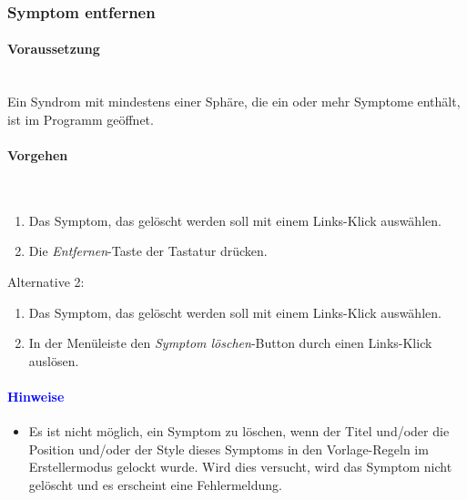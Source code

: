\documentclass[enabledeprecatedfontcommands,fontsize=11pt,paper=a4,twoside]{scrartcl}
\newcommand*{\hint}{\paragraph{\textcolor{blue}{Hinweise}}}
\newcommand*{\condition}{\paragraph{Voraussetzung}$\;$ \vspace{0.2cm}\\}
\newcommand*{\actions}{\paragraph{Vorgehen} $\;$\vspace{0.2cm}\\}
\begin{document}
		\newpage	
		\subsubsection{Symptom entfernen}
				\condition 	
		Ein Syndrom mit mindestens einer Sphäre, die ein oder mehr Symptome enthält, ist im Programm geöffnet. 
		\actions
		\begin{enumerate}
			\item Das Symptom, das gelöscht werden soll mit einem Links-Klick auswählen. 
			\item Die \textit{Entfernen}-Taste der Tastatur drücken.
		\end{enumerate}
		Alternative 2:
		\begin{enumerate}
			\item Das Symptom, das gelöscht werden soll mit einem Links-Klick auswählen. 
			\item In der Menüleiste den \textit{Symptom löschen}-Button durch einen Links-Klick auslösen.
		\end{enumerate}
		\hint
		\begin{itemize}
			\item Es ist nicht möglich, ein Symptom zu löschen, wenn der Titel und/oder die Position und/oder der Style dieses Symptoms in den Vorlage-Regeln im Erstellermodus gelockt wurde. Wird dies versucht, wird das Symptom nicht gelöscht und es erscheint eine Fehlermeldung.
		\end{itemize}
		
				\newpage	
\end{document}
